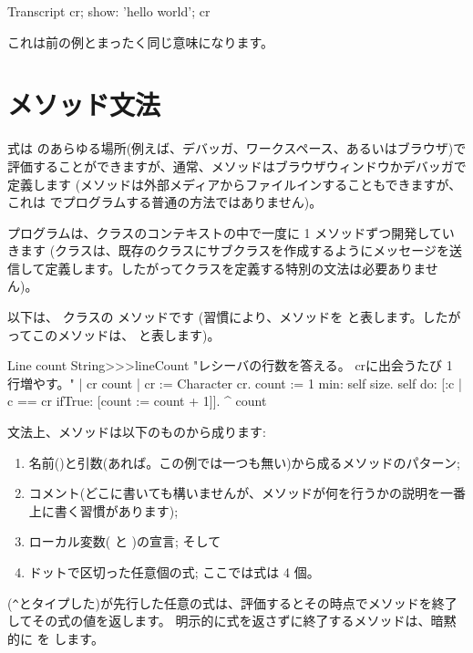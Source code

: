 \documentclass[a4paper,10pt,twoside]{book}
\begin{document}
\begin{code}{}
Transcript cr;
    show: 'hello world';
    cr
\end{code}
これは前の例とまったく同じ意味になります。

\section{メソッド文法}

式は \pharo のあらゆる場所(例えば、デバッガ、ワークスペース、あるいはブラウザ)で評価することができますが、通常、メソッドはブラウザウィンドウかデバッガで定義します
(メソッドは外部メディアからファイルインすることもできますが、これは \pharo でプログラムする普通の方法ではありません)。

プログラムは、クラスのコンテキストの中で一度に 1 メソッドずつ開発していきます
(クラスは、既存のクラスにサブクラスを作成するようにメッセージを送信して定義します。したがってクラスを定義する特別の文法は必要ありません)。

以下は、 クラスの  メソッドです
(習慣により、メソッドを  と表します。したがってこのメソッドは、 と表します)。

\begin{method}[lineCount]{Line count}
String>>>lineCount
   "レシーバの行数を答える。
   crに出会うたび 1 行増やす。"
   | cr count |
   cr := Character cr.
   count := 1 min: self size.
   self do:
      [:c | c == cr ifTrue: [count := count + 1]].
   ^ count
\end{method}

文法上、メソッドは以下のものから成ります:
\begin{enumerate}
  \item 名前(\ie {})と引数(あれば。この例では一つも無い)から成るメソッドのパターン;
  \item コメント(どこに書いても構いませんが、メソッドが何を行うかの説明を一番上に書く習慣があります);
  \item ローカル変数(\ie {} と )の宣言; そして
  \item ドットで区切った任意個の式; ここでは式は 4 個。
\end{enumerate}

\ct{^}(\verb|^|とタイプした)が先行した任意の式は、評価するとその時点でメソッドを終了してその式の値を返します。
明示的に式を返さずに終了するメソッドは、暗黙的に  を します。
\end{document}
